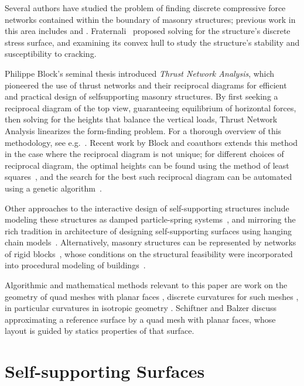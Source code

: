 \documentclass[review]{acmsiggraph}
\begin{document}
Several authors have studied the problem of finding discrete compressive
force networks contained within the boundary of masonry structures; previous
work in this area includes \cite{O'Dwyer98} and
\cite{andreu-2007}. Fraternali~ proposed solving
for the structure's discrete stress surface, and examining its convex hull
to study the structure's stability and susceptibility to cracking.

Philippe Block's seminal thesis introduced {\it Thrust
Network Analysis}, which pioneered the use of thrust networks and their
reciprocal diagrams for efficient and practical design of self\dash supporting
masonry structures. By first seeking a reciprocal diagram of the top view, guaranteeing equilibrium
of horizontal forces, then solving for the heights that balance the
vertical loads, Thrust Network Analysis linearizes the form-finding problem.
For a thorough overview of this methodology, see e.g.\ \cite{Block07,block09}.
Recent work by Block and coauthors extends this method in the case where the reciprocal diagram
is not unique; for different choices of reciprocal diagram, the optimal
heights can be found using the method of least squares~\cite{vanmele2011},
and the search for the best such reciprocal diagram can be automated using
a genetic algorithm~\cite{Block2011}.

Other approaches to the interactive design of self-supporting structures
include modeling these structures as damped particle-spring
systems~\cite{Kilian2005,barnes09}, and mirroring the rich tradition in
architecture of designing self-supporting surfaces using hanging chain
models~\cite{Heyman98}. Alternatively, masonry structures can be
represented by networks of rigid blocks~\cite{Livesley92}, whose conditions
on the structural feasibility were incorporated into procedural modeling
of buildings~\cite{Whiting09}.

Algorithmic and mathematical methods relevant to this paper are work on
the geometry of quad meshes with planar faces \cite{Glymph2004,Liu2006},
discrete curvatures for such meshes \cite{Pottmann2007b,bobenko-2010-ct},
in particular curvatures in isotropic geometry \cite{Pottmann2007}.
Schiftner and Balzer  discuss approximating a
reference surface by a quad mesh with planar faces, whose layout is guided
by statics properties of that surface.


\section{Self-supporting Surfaces}
\end{document}
